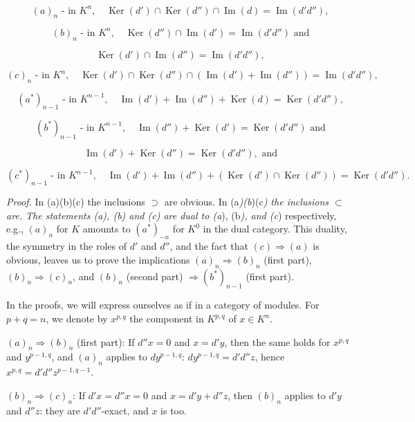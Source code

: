\documentclass[
  english,
  a3paper,
  a3paper]{extarticle}
\begin{document}
\[(a)_n\text{ - in }K^n,\quad\operatorname{Ker}(d')\cap\operatorname{Ker}(d'')\cap\operatorname{Im}(d)=\operatorname{Im}(d'd''),\]

\[(b)_n\text{ - in }K^n,\quad\operatorname{Ker}(d'')\cap\operatorname{Im}(d')=\operatorname{Im}(d'd'')\text{ and}\]

\[\operatorname{Ker}(d')\cap\operatorname{Im}(d'')=\operatorname{Im}(d'd''),\]

\[(c)_n\text{ - in }K^n,\quad\operatorname{Ker}(d')\cap\operatorname{Ker}(d'')\cap(\operatorname{Im}(d')+\operatorname{Im}(d''))=\operatorname{Im}(d'd''),\]

\[(a^*)_{n-1}\text{ - in }K^{n-1},\quad\operatorname{Im}(d')+\operatorname{Im}(d'')+\operatorname{Ker}(d)=\operatorname{Ker}(d'd''),\]

\[(b^*)_{n-1}\text{ - in }K^{n-1},\quad\operatorname{Im}(d'')+\operatorname{Ker}(d')=\operatorname{Ker}(d'd'')\text{ and}\]

\[\operatorname{Im}(d')+\operatorname{Ker}(d'')=\operatorname{Ker}(d'd''),\text{ and}\]

\[(c^*)_{n-1}\text{ - in }K^{n-1},\quad\operatorname{Im}(d')+\operatorname{Im}(d'')+(\operatorname{Ker}(d')\cap\operatorname{Ker}(d''))=\operatorname{Ker}(d'd'').\]

\emph{Proof.} In (a)(b)(c) the inclusions \(\supset\) are obvious. In
(a\emph{)(b})(c\emph{) the inclusions \(\subset\) are. The statements
(a), (b) and (c) are dual to (a}), (b\emph{), and (c}) respectively,
e.g., \((a)_n\) for \(K\) amounts to \((a^*)_{-n}\) for \(K^0\) in the
dual category. This duality, the symmetry in the roles of \(d'\) and
\(d''\), and the fact that \((c)\Rightarrow(a)\) is obvious, leaves us
to prove the implications \((a)_n\Rightarrow(b)_n\) (first part),
\((b)_n\Rightarrow(c)_n\), and \((b)_n\) (second part)
\(\Rightarrow(b^*)_{n-1}\) (first part).

In the proofs, we will express ourselves as if in a category of modules.
For \(p+q=n\), we denote by \(x^{p,q}\) the component in \(K^{p,q}\) of
\(x\in K^n\).

\((a)_n\Rightarrow(b)_n\) (first part): If \(d''x=0\) and \(x=d'y\),
then the same holds for \(x^{p,q}\) and \(y^{p-1,q}\), and \((a)_n\)
applies to \(dy^{p-1,q}\): \(dy^{p-1,q}=d'd''z\), hence
\(x^{p,q}=d'd''z^{p-1,q-1}\).

\((b)_n\Rightarrow(c)_n\): If \(d'x=d''x=0\) and \(x=d'y+d''z\), then
\((b)_n\) applies to \(d'y\) and \(d''z\): they are \(d'd''\)-exact, and
\(x\) is too.
\end{document}
